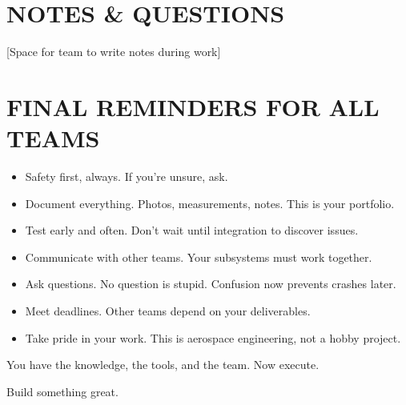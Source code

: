 \documentclass[11pt,letterpaper]{article}
\begin{document}
\section{NOTES \& QUESTIONS}

[Space for team to write notes during work]\par

\section{FINAL REMINDERS FOR ALL TEAMS}

\begin{itemize}
  \item Safety first, always. If you're unsure, ask.
  \item Document everything. Photos, measurements, notes. This is your portfolio.
  \item Test early and often. Don't wait until integration to discover issues.
  \item Communicate with other teams. Your subsystems must work together.
  \item Ask questions. No question is stupid. Confusion now prevents crashes later.
  \item Meet deadlines. Other teams depend on your deliverables.
  \item Take pride in your work. This is aerospace engineering, not a hobby project.
\end{itemize}

You have the knowledge, the tools, and the team. Now execute.\par

Build something great.\par
\end{document}
